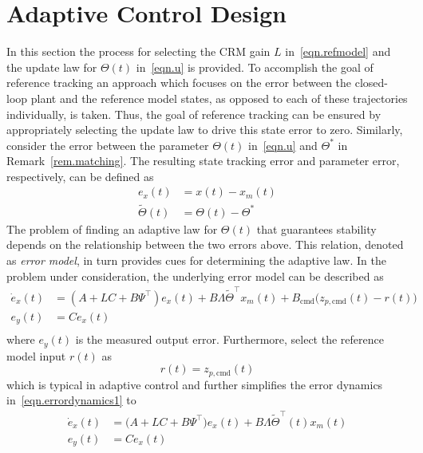 \section{Adaptive Control Design}\label{sec.adaptivecontroldesign}

In this section the process for selecting the CRM gain $L$ in\ \eqref{eqn.refmodel} and the update law for $\Theta(t)$ in\ \eqref{eqn.u} is provided.
To accomplish the goal of reference tracking an approach which focuses on the error between the closed-loop plant and the reference model states, as opposed to each of these trajectories individually, is taken.
Thus, the goal of reference tracking can be ensured by appropriately selecting the update law to drive this state error to zero.
Similarly, consider the error between the parameter $\Theta(t)$ in\ \eqref{eqn.u} and $\Theta^{*}$ in Remark~\ref{rem.matching}.
The resulting state tracking error and parameter error, respectively, can be defined as
\begin{align*}
  e_{x}(t) &= x(t) - x_{m}(t) \\
  \widetilde{\Theta}(t) &= \Theta(t) - \Theta^{*}
\end{align*}
The problem of finding an adaptive law for $\Theta(t)$ that guarantees stability depends on the relationship between the two errors above.
This relation, denoted as \textit{error model}, in turn provides cues for determining the adaptive law.
In the problem under consideration, the underlying error model can be described as
\begin{equation}
  \label{eqn.errordynamics1}
  \begin{split}
    \dot{e}_{x}(t) &= (A+LC+B\Psi^{\top})e_{x}(t) + B\Lambda\widetilde{\Theta}^{\top}x_{m}(t) + B_{\text{cmd}}\bigr(z_{p,\text{cmd}}(t) - r(t)\bigr) \\
    e_{y}(t) &= Ce_{x}(t) \\
  \end{split}
\end{equation}
where $e_{y}(t)$ is the measured output error.
Furthermore, select the reference model input $r(t)$ as
\begin{equation}
  \label{eqn.zcmd1}
  r(t) = z_{p,\text{cmd}}(t)
\end{equation}
which is typical in adaptive control and further simplifies the error dynamics in\ \eqref{eqn.errordynamics1} to
\begin{equation}
  \label{eqn.errordynamics2}
  \begin{split}
    \dot{e}_{x}(t) &= \bigr(A+LC+B\Psi^{\top}\bigr)e_{x}(t) + B\Lambda\widetilde{\Theta}^{\top}(t)x_{m}(t) \\
    e_{y}(t) &= Ce_{x}(t) \\
  \end{split}
\end{equation}
